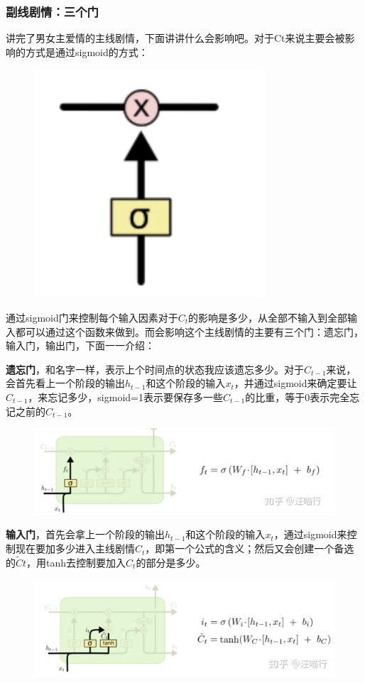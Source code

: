 \documentclass[12pt]{article}
\begin{document}
\subsubsection{副线剧情：三个门}
讲完了男女主爱情的主线剧情，下面讲讲什么会影响吧。对于Ct来说主要会被影响的方式是通过sigmoid的方式：
\begin{figure}[H]
    \centering
    \includegraphics[width=.3\textwidth]{fig/LSTM_Gate_Sigmoid.png}
\end{figure}

通过sigmoid门来控制每个输入因素对于$C_t$的影响是多少，从全部不输入到全部输入都可以通过这个函数来做到。而会影响这个主线剧情的主要有三个门：遗忘门，输入门，输出门，下面一一介绍：

\textbf{遗忘门}，和名字一样，表示上个时间点的状态我应该遗忘多少。对于$C_{t-1}$来说，会首先看上一个阶段的输出$h_{t-1}$和这个阶段的输入$x_{t}$，并通过sigmoid来确定要让$C_{t-1}$，来忘记多少，sigmoid=1表示要保存多一些$C_{t-1}$的比重，等于0表示完全忘记之前的$C_{t-1}$。
\begin{figure}[H]
    \centering
    \includegraphics[width=.8\textwidth]{fig/LSTM_Gate_Forget.png}
\end{figure}

\textbf{输入门}，首先会拿上一个阶段的输出$h_{t-1}$和这个阶段的输入$x_{t}$，通过sigmoid来控制现在要加多少进入主线剧情$C_t$，即第一个公式的含义；然后又会创建一个备选的$\tilde{C}t$，用tanh去控制要加入$C_t$的部分是多少。
\begin{figure}[H]
    \centering
    \includegraphics[width=.8\textwidth]{fig/LSTM_Gate_Input.png}
\end{figure}
\end{document}
